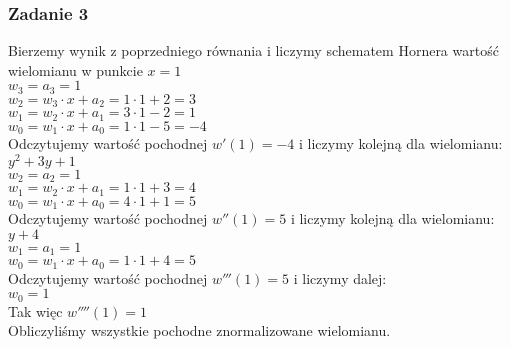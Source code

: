 \documentclass[a4paper]{article}
\begin{document}
\subsubsection*{Zadanie 3}
Bierzemy wynik z poprzedniego równania i liczymy schematem Hornera wartość wielomianu w punkcie $x=1$\\
$w_3 = a_3 = 1$ \\
$w_2 = w_3\cdot x + a_2 = 1\cdot 1 + 2 = 3$ \\
$w_1 = w_2\cdot x + a_1 = 3\cdot 1 - 2 = 1$ \\
$w_0 = w_1\cdot x + a_0 = 1\cdot 1 - 5 = -4$ \\
Odczytujemy wartość pochodnej $w'(1) = -4$ i liczymy kolejną dla wielomianu: \\
$y^2 + 3y + 1$ \\
$w_2 = a_2 = 1$ \\
$w_1 = w_2\cdot x + a_1 = 1 \cdot 1 + 3 = 4$ \\
$w_0 = w_1\cdot x + a_0 = 4 \cdot 1 + 1 = 5$ \\
Odczytujemy wartość pochodnej $w''(1) = 5$ i liczymy kolejną dla wielomianu: \\
$y + 4$\\
$w_1 = a_1 = 1$ \\
$w_0 = w_1 \cdot x + a_0 = 1\cdot 1+4 = 5$ \\
Odczytujemy wartość pochodnej $w'''(1) = 5$ i liczymy dalej: \\
$w_0 = 1$\\
Tak więc $w''''(1) = 1$\\
Obliczyliśmy wszystkie pochodne znormalizowane wielomianu.
\end{document}
